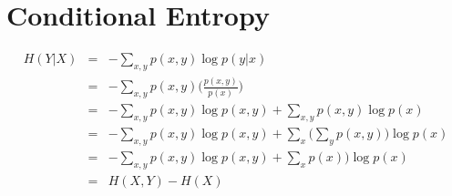 \documentclass{article}
\newcommand{\ber}{\begin{eqnarray}}
\newcommand{\eer}{\end{eqnarray}}
\begin{document}
\section{Conditional Entropy}
\ber
H(Y|X) &=& -\sum_{x,y}p(x,y)\log{p(y|x)} \\
&=&  -\sum_{x,y}p(x,y)\Big(\frac{p(x,y)}{p(x)}\Big) \\
&=&  -\sum_{x,y}p(x,y)\log{p(x,y)} + \sum_{x,y}p(x,y)\log{p(x)} \\
&=& -\sum_{x,y}p(x,y)\log{p(x,y)} + \sum_{x}\Big(\sum_{y}p(x,y)\Big)\log{p(x)} \\
&=& -\sum_{x,y}p(x,y)\log{p(x,y)} + \sum_{x}p(x)\Big)\log{p(x)} \\
&=& H(X,Y)- H(X)
\eer
\end{document}

